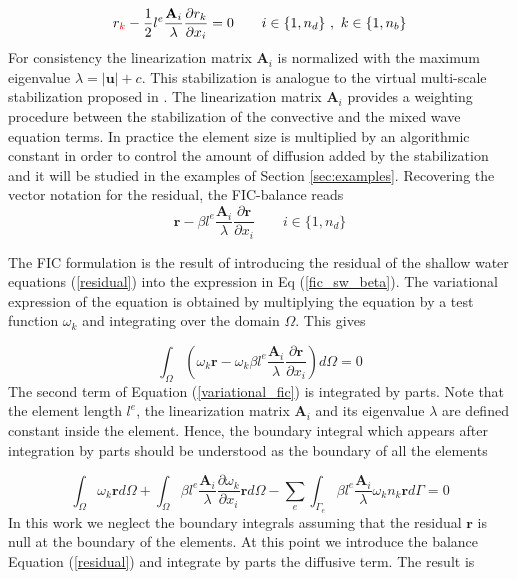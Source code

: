 \documentclass[a4paper,12pt]{elsarticle}
\newcommand{\Miguel}[1]{\textcolor{red}{#1}}
\newcommand{\pder}[2]{\frac{\partial#1}{\partial#2}}
\newcommand{\abs}[1]{\lvert#1\rvert}
\begin{document}
\begin{equation} \label{fic_sw}
r_{\Miguel{k}} - \frac{1}{2}l^e\frac{\mathbf{A}_i}{\lambda}\pder{r_k}{x_i} = 0
    \qquad i\in\{1,n_d\} \ ,\ k\in\{1,n_b\}
\end{equation}
For consistency the linearization matrix $\mathbf{A}_i$ is normalized with the maximum eigenvalue $\lambda=\abs{\mathbf{u}} + c$. This stabilization is analogue to the virtual multi-scale stabilization proposed in \cite{codina2008b}. The linearization matrix $\mathbf{A}_i$ provides a weighting procedure between the stabilization of the convective and the mixed wave equation terms. In practice the element size is multiplied by an algorithmic constant in order to control the amount of diffusion added by the stabilization and it will be studied in the examples of Section \ref{sec:examples}. Recovering the vector notation for the residual, the FIC-balance reads
\begin{equation} \label{fic_sw_beta}
\mathbf{r} - \beta l^e\frac{\mathbf{A}_i}{\lambda}\pder{\mathbf{r}}{x_i}
    \qquad i\in\{1,n_d\}
\end{equation}

The FIC formulation is the result of introducing the residual of the shallow water equations (\ref{residual}) into the expression in Eq (\ref{fic_sw_beta}). The variational expression of the equation is obtained by multiplying the equation by a test function $\omega_k$ and integrating over the domain $\Omega$. This gives

\begin{equation} \label{variational_fic}
\int_\Omega \left(
    \omega_k \mathbf{r} - \omega_k \beta l^e\frac{\mathbf{A}_i}{\lambda}\pder{\mathbf{r}}{x_i}
\right) d\Omega = 0
\end{equation}
The second term of Equation (\ref{variational_fic}) is integrated by parts. Note that the element length $l^e$, the linearization matrix $\mathbf{A}_i$ and its eigenvalue $\lambda$ are defined constant inside the element. Hence, the boundary integral which appears after integration by parts should be understood as the boundary of all the elements

\begin{equation} \label{variational_fic_parts}
\int_\Omega \omega_k \mathbf{r} d\Omega
+ \int_\Omega \beta l^e\frac{\mathbf{A}_i}{\lambda}\pder{\omega_k}{x_i} \mathbf{r} d\Omega
- \sum_e \int_{\Gamma_e} \beta l^e\frac{\mathbf{A}_i}{\lambda}\omega_kn_k \mathbf{r} d\Gamma = 0
\end{equation}
In this work we neglect the boundary integrals assuming that the residual $\mathbf{r}$ is null at the boundary of the elements. At this point we introduce the balance Equation (\ref{residual}) and integrate by parts the diffusive term. The result is
\end{document}

